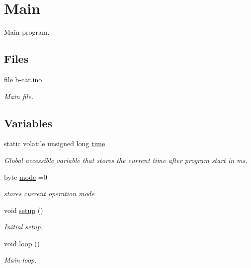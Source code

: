 \hypertarget{group__main}{}\section{Main}
\label{group__main}


Main program.  


\subsection*{Files}
\begin{DoxyCompactItemize}
\item 
file \hyperlink{b-car_8ino}{b-\/car.\+ino}
\begin{DoxyCompactList}\small\item\em Main file. \end{DoxyCompactList}\end{DoxyCompactItemize}
\subsection*{Variables}
\begin{DoxyCompactItemize}
\item 
static volatile unsigned long \hyperlink{group__main_ga4f944bfefd58754546ebcc7c5143442c}{time}
\begin{DoxyCompactList}\small\item\em Global accessible variable that stores the current time after program start in ms. \end{DoxyCompactList}\item 
byte \hyperlink{group__main_ga988166baebc4b27bd18de27cd40f8b5a}{mode} =0
\begin{DoxyCompactList}\small\item\em stores current operation mode \end{DoxyCompactList}\end{DoxyCompactItemize}
\begin{DoxyCompactItemize}
\item 
void \hyperlink{group__main_ga4fc01d736fe50cf5b977f755b675f11d}{setup} ()
\begin{DoxyCompactList}\small\item\em Initial setup. \end{DoxyCompactList}\item 
void \hyperlink{group__main_gafe461d27b9c48d5921c00d521181f12f}{loop} ()
\begin{DoxyCompactList}\small\item\em Main loop. \end{DoxyCompactList}\end{DoxyCompactItemize}


